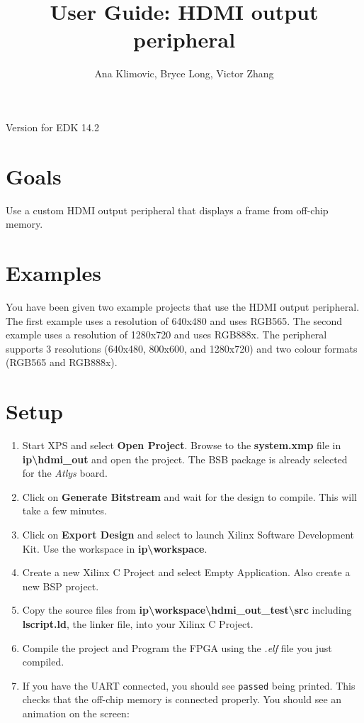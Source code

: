 \documentclass[12pt]{article}
\title{User Guide: HDMI output peripheral}
\author{Ana Klimovic, Bryce Long, Victor Zhang}
\begin{document}
  \maketitle
  Version for EDK 14.2
  \section{Goals}
  Use a custom HDMI output peripheral that displays a frame from off-chip memory.
  \section{Examples}
  You have been given two example projects that use the HDMI output peripheral. The first example uses a resolution of 640x480 and uses RGB565. The second example uses a resolution of 1280x720 and uses RGB888x. The peripheral supports 3 resolutions (640x480, 800x600, and 1280x720) and two colour formats (RGB565 and RGB888x).
  \section{Setup}
  \begin{enumerate}
    \item Start XPS and select \textbf {Open Project}. Browse to the \textbf {system.xmp} file in \textbf {ip\textbackslash{}hdmi\_out} and open the project. The BSB package is already selected for the \textit {Atlys} board.
    \item Click on \textbf {Generate Bitstream} and wait for the design to compile. This will take a few minutes.
    \item Click on \textbf {Export Design} and select to launch Xilinx Software Development Kit. Use the workspace in \textbf {ip\textbackslash{}workspace}.
    \item Create a new Xilinx C Project and select Empty Application. Also create a new BSP project.
    \item Copy the source files from \textbf {ip\textbackslash{}workspace\textbackslash{}hdmi\_out\_test\textbackslash{}src} including \textbf {lscript.ld}, the linker file, into your Xilinx C Project.
    \item Compile the project and Program the FPGA using the \textit {.elf} file you just compiled.
    \item If you have the UART connected, you should see \texttt {passed} being printed. This checks that the off-chip memory is connected properly. You should see an animation on the screen:
  \end{enumerate}
\end{document}
